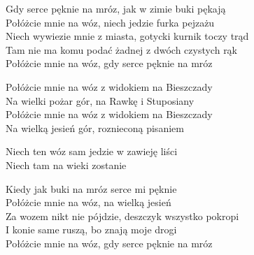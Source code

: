 \begin{text}
\small{Gdy serce pęknie na mróz, jak w zimie buki pękają\\
Połóżcie mnie na wóz, niech jedzie furka pejzażu\\
Niech wywiezie mnie z miasta, gotycki kurnik toczy trąd\\
Tam nie ma komu podać żadnej z dwóch czystych rąk\\
Połóżcie mnie na wóz, gdy serce pęknie na mróz

Połóżcie mnie na wóz z widokiem na Bieszczady\\
Na wielki pożar gór, na Rawkę i Stuposiany\\
Połóżcie mnie na wóz z widokiem na Bieszczady\\
Na wielką jesień gór, roznieconą pisaniem

Niech ten wóz sam jedzie w zawieję liści\\
Niech tam na wieki zostanie

Kiedy jak buki na mróz serce mi pęknie\\
Połóżcie mnie na wóz, na wielką jesień\\
Za wozem nikt nie pójdzie, deszczyk wszystko pokropi\\
I konie same ruszą, bo znają moje drogi\\
Połóżcie mnie na wóz, gdy serce pęknie na mróz}
\end{text}